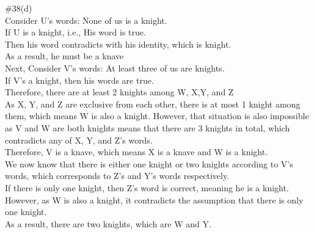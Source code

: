 \documentclass{article}
\begin{document}
\#38(d)\\
Consider U's words:
None of us is a knight.\\
If U is a knight, i.e., His word is true.\\
Then his word contradicts with his identity, which is knight.\\
As a result, he must be a knave\\
Next, Consider V's words: At least three of us are knights.\\
If V's a knight, then his words are true.\\
Therefore, there are at least 2 knights among W, X,Y, and Z\\
As X, Y, and Z are exclusive from each other, there is at most 1 knight among them, which means W is also a knight. However, that situation is also impossible as V and W are both knights means that there are 3 knights in total, which contradicts any of X, Y, and Z's words.\\
Therefore, V is a knave, which means X is a knave and W is a knight.\\
We now know that there is either one knight or two knights according to V's words, which corresponds to Z's and Y's words respectively. \\
If there is only one knight, then Z's word is correct, meaning he is a knight. However, as W is also a knight, it contradicts the assumption that there is only one knight.\\
As a result, there are two knights, which are W and Y.
\end{document}
